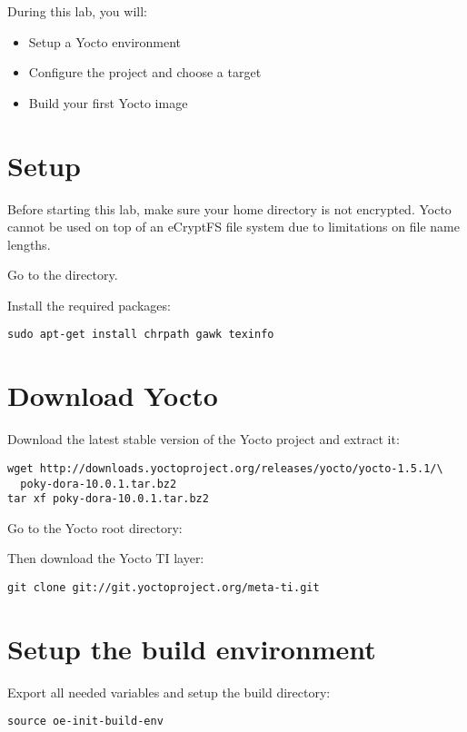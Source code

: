 
During this lab, you will:
\begin{itemize}
  \item Setup a Yocto environment
  \item Configure the project and choose a target
  \item Build your first Yocto image
\end{itemize}

\section{Setup}

Before starting this lab, make sure your home directory is not encrypted. Yocto
cannot be used on top of an eCryptFS file system due to limitations on file name
lengths.

Go to the  directory.

Install the required packages:
\begin{verbatim}
sudo apt-get install chrpath gawk texinfo
\end{verbatim}



\section{Download Yocto}

Download the latest stable version of the Yocto project and extract it:
\begin{verbatim}
wget http://downloads.yoctoproject.org/releases/yocto/yocto-1.5.1/\
  poky-dora-10.0.1.tar.bz2
tar xf poky-dora-10.0.1.tar.bz2
\end{verbatim}

Go to the Yocto root directory: 

Then download the Yocto TI layer:
\begin{verbatim}
git clone git://git.yoctoproject.org/meta-ti.git
\end{verbatim}

\section{Setup the build environment}

Export all needed variables and setup the build directory:
\begin{verbatim}
source oe-init-build-env
\end{verbatim}

